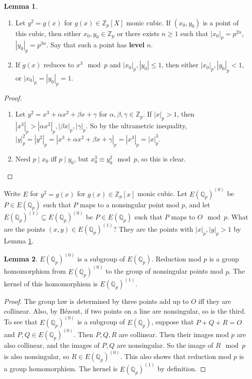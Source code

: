 \documentclass{article}
\newcommand{\Z}{\mathbb{Z}}
\newcommand{\Q}{\mathbb{Q}}
\newcommand{\rb}[1]{\left( #1 \right)}
\renewcommand{\sb}[1]{\left[ #1 \right]}
\newcommand{\abs}[1]{\left\lvert #1 \right\rvert}
\theoremstyle{definition}\newtheorem{definition}{Definition}[section]
\theoremstyle{definition}\newtheorem{remark}[definition]{Remark}
\theoremstyle{definition}\newtheorem*{example}{Example}
\theoremstyle{definition}\newtheorem*{note}{Note}
\newtheorem{lemma}[definition]{Lemma}
\begin{document}
\begin{lemma}
\label{lem:7.1}
\hfill
\begin{enumerate}
\item Let $ y^2 = g\rb{x} $ for $ g\rb{x} \in \Z_p\sb{X} $ monic cubic. If $ \rb{x_0, y_0} $ is a point of this cubic, then either $ x_0, y_0 \in \Z_p $ or there exists $ n \ge 1 $ such that $ \abs{x_0}_p = p^{2n} $, $ \abs{y_0}_p = p^{3n} $. Say that such a point has \textbf{level} $ n $.
\item If $ g\rb{x} $ reduces to $ x^3 \mod p $ and $ \abs{x_0}_p, \abs{y_0} \le 1 $, then either $ \abs{x_0}_p, \abs{y_0}_p < 1 $, or $ \abs{x_0}_p = \abs{y_0}_p = 1 $.
\end{enumerate}
\end{lemma}

\begin{proof}
\hfill
\begin{enumerate}
\item Let $ y^2 = x^3 + \alpha x^2 + \beta x + \gamma $ for $ \alpha, \beta, \gamma \in \Z_p $. If $ \abs{x}_p > 1 $, then $ \abs{x^3}_p > \abs{\alpha x^2}_p, \abs{\beta x}_p, \abs{\gamma}_p $. So by the ultrametric inequality, $ \abs{y}_p^2 = \abs{y^2}_p = \abs{x^3 + \alpha x^2 + \beta x + \gamma}_p = \abs{x^3}_p = \abs{x}_p^3 $.
\item Need $ p \mid x_0 $ iff $ p \mid y_0 $, but $ x_0^3 \equiv y_0^2 \mod p $, so this is clear.
\end{enumerate}
\end{proof}

Write $ E $ for $ y^2 = g\rb{x} $ for $ g\rb{x} \in \Z_p\sb{x} $ monic cubic. Let $ E\rb{\Q_p}^{\rb{0}} $ be $ P \in E\rb{\Q_p} $ such that $ P $ maps to a nonsingular point mod $ p $, and let $ E\rb{\Q_p}^{\rb{1}} \subseteq E\rb{\Q_p}^{\rb{0}} $ be $ P \in E\rb{\Q_p} $ such that $ P $ maps to $ O \mod p $. What are the points $ \rb{x, y} \in E\rb{\Q_p}^{\rb{1}} $? They are the points with $ \abs{x}_p, \abs{y}_p > 1 $ by Lemma \ref{lem:7.1}.

\begin{lemma}
\label{lem:7.2}
$ E\rb{\Q_p}^{\rb{0}} $ is a subgroup of $ E\rb{\Q_p} $. Reduction mod $ p $ is a group homomorphism from $ E\rb{\Q_p}^{\rb{0}} $ to the group of nonsingular points mod $ p $. The kernel of this homomorphism is $ E\rb{\Q_p}^{\rb{1}} $.
\end{lemma}

\begin{proof}
The group law is determined by three points add up to $ O $ iff they are collinear. Also, by Bézout, if two points on a line are nonsingular, so is the third. To see that $ E\rb{\Q_p}^{\rb{0}} $ is a subgroup of $ E\rb{\Q_p} $, suppose that $ P + Q + R = O $ and $ P, Q \in E\rb{\Q_p}^{\rb{0}} $. Then $ P, Q, R $ are collinear. Then their images mod $ p $ are also collinear, and the images of $ P, Q $ are nonsingular. So the image of $ R \mod p $ is also nonsingular, so $ R \in E\rb{\Q_p}^{\rb{0}} $. This also shows that reduction mod $ p $ is a group homomorphism. The kernel is $ E\rb{\Q_p}^{\rb{1}} $ by definition.
\end{proof}
\end{document}
